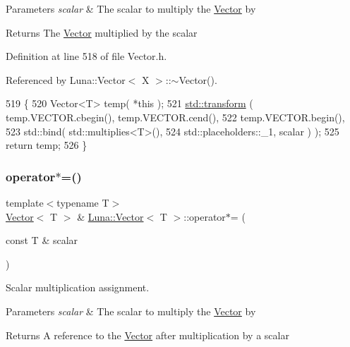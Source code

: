 \begin{DoxyParams}{Parameters}
{\em scalar} & The scalar to multiply the \hyperlink{classLuna_1_1Vector}{Vector} by \\
\hline
\end{DoxyParams}
\begin{DoxyReturn}{Returns}
The \hyperlink{classLuna_1_1Vector}{Vector} multiplied by the scalar 
\end{DoxyReturn}


Definition at line 518 of file Vector.\+h.



Referenced by Luna\+::\+Vector$<$ X $>$\+::$\sim$\+Vector().


\begin{DoxyCode}
519   \{
520     Vector<T> temp( *\textcolor{keyword}{this} );
521     \hyperlink{namespaceHeat__plot_aeaa6785bedcad63b4bd40e8cb1bad8a0}{std::transform} ( temp.VECTOR.cbegin(), temp.VECTOR.cend(),
522                      temp.VECTOR.begin(),
523                      std::bind( std::multiplies<T>(),
524                                 std::placeholders::\_1, scalar ) );
525     \textcolor{keywordflow}{return} temp;
526   \}
\end{DoxyCode}
\mbox{\label{classLuna_1_1Vector_aad04978d7a710d8091bbbb0497173547}} 
\subsubsection{\texorpdfstring{operator$\ast$=()}{operator*=()}}
{\footnotesize\ttfamily template$<$typename T$>$ \\
\hyperlink{classLuna_1_1Vector}{Vector}$<$ T $>$ \& \hyperlink{classLuna_1_1Vector}{Luna\+::\+Vector}$<$ T $>$\+::operator$\ast$= (\begin{DoxyParamCaption}\item[{const T \&}]{scalar }\end{DoxyParamCaption})\hspace{0.3cm}{\ttfamily [inline]}}



Scalar multiplication assignment. 


\begin{DoxyParams}{Parameters}
{\em scalar} & The scalar to multiply the \hyperlink{classLuna_1_1Vector}{Vector} by \\
\hline
\end{DoxyParams}
\begin{DoxyReturn}{Returns}
A reference to the \hyperlink{classLuna_1_1Vector}{Vector} after multiplication by a scalar 
\end{DoxyReturn}


